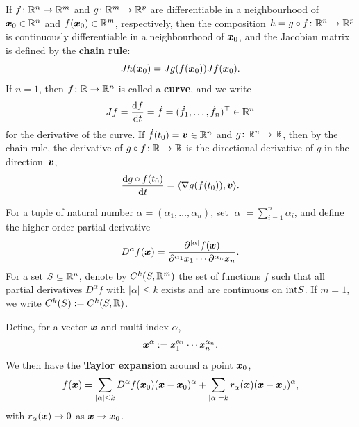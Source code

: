 \documentclass[11pt,a4paper]{memoir}
\begin{document}
If $f\colon \mathbb{R}^n\to \mathbb{R}^m$ and $g\colon \mathbb{R}^m\to \mathbb{R}^p$ are differentiable in a neighbourhood of $\bm{x}_0\in \mathbb{R}^n$ and $f(\bm{x}_0)\in \mathbb{R}^m$, respectively, then the composition $h=g\circ f\colon \mathbb{R}^n\to \mathbb{R}^p$ is continuously differentiable in a neighbourhood of $\bm{x}_0$, and the Jacobian matrix is defined by the \textbf{chain rule}:
\begin{equation*}
 Jh(\bm{x}_0) = Jg(f(\bm{x}_0))Jf(\bm{x}_0).
\end{equation*}
If $n=1$, then $f\colon \mathbb{R}\to \mathbb{R}^n$ is called a \textbf{curve}, and we write 
\begin{equation*}
 Jf = \frac{\mathrm{d}{f}}{\mathrm{d}{t}}=\dot{f}=(\dot{f}_1,\dots,\dot{f}_n)^{\top}\in \mathbb{R}^n
\end{equation*}
for the derivative of the curve. If $\dot{f}(t_0)=\bm{v}\in \mathbb{R}^n$ and $g\colon \mathbb{R}^n\to \mathbb{R}$, then by the chain rule, the derivative of $g\circ f\colon \mathbb{R}\to \mathbb{R}$ is the directional derivative of $g$ in the direction~$\bm{v}$,
\begin{equation*}
 \frac{\mathrm{d}{g\circ f}(t_0)}{\mathrm{d}{t}} = \langle {\nabla g(f(t_0))}, {\bm{v}} \rangle.
\end{equation*}

For a tuple of natural number $\alpha = (\alpha_1,\dots,\alpha_n)$, set $|\alpha|=\sum_{i=1}^n \alpha_i$, and define the higher order partial derivative
\begin{equation*}
 D^\alpha f(\bm{x}) = \frac{\partial^{|\alpha|}f(\bm{x})}{\partial^{\alpha_1}x_1\cdots \partial^{\alpha_n}x_n}.
\end{equation*}
For a set $S\subseteq \mathbb{R}^n$, denote by $C^k(S,\mathbb{R}^m)$ the set of functions $f$ such that all partial derivatives $D^\alpha f$ with $|\alpha|\leq k$ exists and are continuous on ${\operatorname{int}} S$. If $m=1$, we write $C^k(S):=C^k(S,\mathbb{R})$.

Define, for a vector $\bm{x}$ and multi-index $\alpha$,
\begin{equation*}
 \bm{x}^{\alpha} := x_1^{\alpha_1}\cdots x_n^{\alpha_n}.
\end{equation*}
We then have the \textbf{Taylor expansion} around a point $\bm{x}_0$,
\begin{equation*}
 f(\bm{x}) = \sum_{|\alpha|\leq k} D^{\alpha}f(\bm{x}_0)(\bm{x}-\bm{x}_0)^{\alpha} + \sum_{|\alpha|=k} r_\alpha(\bm{x})(\bm{x}-\bm{x}_0)^{\alpha},
\end{equation*}
with $r_\alpha(\bm{x})\to 0$ as $\bm{x}\to \bm{x}_0$.
\end{document}
